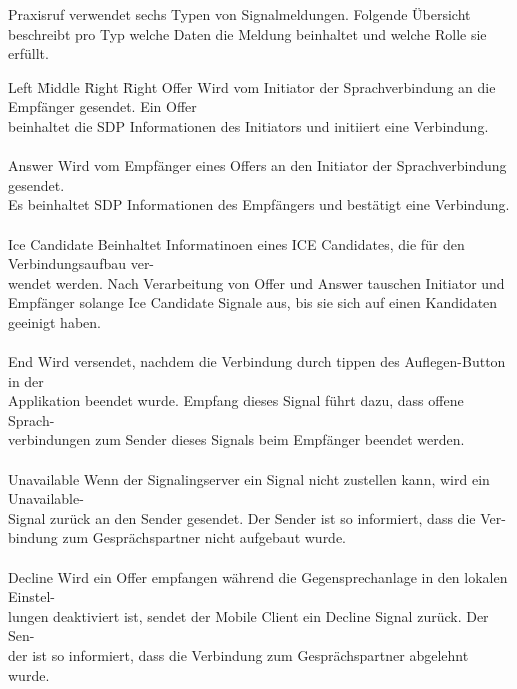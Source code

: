 Praxisruf verwendet sechs Typen von Signalmeldungen.
Folgende Übersicht beschreibt pro Typ welche Daten die Meldung beinhaltet und welche Rolle sie erfüllt.
\\
\begin{tabbing}
    Left \= Middle \= Right \= Right \kill
    Offer
    \> \> \> Wird vom Initiator der Sprachverbindung an die Empfänger gesendet. Ein Offer
    \\\> \> \> beinhaltet die SDP Informationen des Initiators und initiiert eine Verbindung. \\ \\

    Answer
    \> \> \> Wird vom Empfänger eines Offers an den Initiator der Sprachverbindung gesendet.
    \\\> \> \> Es beinhaltet SDP Informationen des Empfängers und bestätigt eine Verbindung. \\ \\

    Ice Candidate
    \> \> \> Beinhaltet Informatinoen eines ICE Candidates, die für den Verbindungsaufbau ver-
    \\ \> \> \> wendet werden. Nach Verarbeitung von Offer und Answer tauschen Initiator und
    \\ \> \> \> Empfänger solange Ice Candidate Signale aus, bis sie sich auf einen Kandidaten
    \\ \> \> \> geeinigt haben.
    \\ \> \> \> \\

    End
    \> \> \> Wird versendet, nachdem die Verbindung durch tippen des Auflegen-Button in der
    \\ \> \> \> Applikation beendet wurde. Empfang dieses Signal führt dazu, dass offene Sprach-
    \\ \> \> \> verbindungen zum Sender dieses Signals beim Empfänger beendet werden.\\ \\

    Unavailable
    \> \> \> Wenn der Signalingserver ein Signal nicht zustellen kann, wird ein Unavailable-
    \\ \> \> \> Signal zurück an den Sender gesendet. Der Sender ist so informiert, dass die Ver-
    \\ \> \> \> bindung zum Gesprächspartner nicht aufgebaut wurde. \\ \\

    Decline
    \> \> \> Wird ein Offer empfangen während die Gegensprechanlage in den lokalen Einstel-
    \\ \> \> \> lungen deaktiviert ist, sendet der Mobile Client ein Decline Signal zurück. Der Sen-
    \\ \> \> \>  der ist so informiert, dass die Verbindung zum Gesprächspartner abgelehnt wurde.
\end{tabbing}

